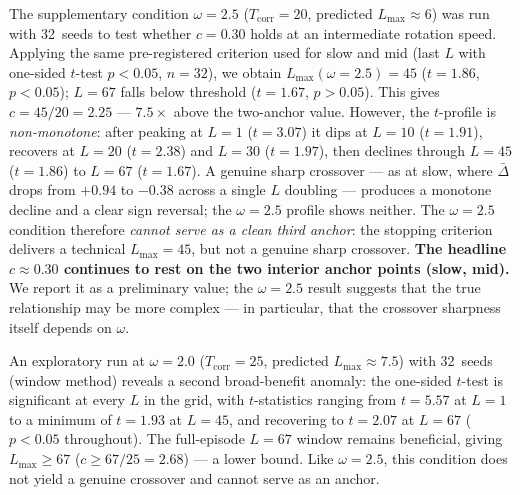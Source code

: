 \documentclass[sigconf,anonymous]{aamas}
\newcommand{\Dbar}{\bar{\Delta}}
\newcommand{\Lmax}{L_{\max}}
\newcommand{\Tcorr}{T_{\mathrm{corr}}}
\begin{document}
The supplementary condition $\omega{=}2.5$ ($\Tcorr{=}20$, predicted
$\Lmax\approx6$) was run with 32~seeds to test whether $c{=}0.30$
holds at an intermediate rotation speed.  Applying the same
pre-registered criterion used for slow and mid (last $L$ with one-sided
$t$-test $p{<}0.05$, $n{=}32$), we obtain $\Lmax(\omega{=}2.5){=}45$
($t{=}1.86$, $p{<}0.05$); $L{=}67$ falls below threshold
($t{=}1.67$, $p{>}0.05$).  This gives $c{=}45/20{=}2.25$ —
$7.5\times$ above the two-anchor value.  However, the $t$-profile is
\emph{non-monotone}: after peaking at $L{=}1$ ($t{=}3.07$) it dips
at $L{=}10$ ($t{=}1.91$), recovers at $L{=}20$ ($t{=}2.38$) and
$L{=}30$ ($t{=}1.97$), then declines through $L{=}45$ ($t{=}1.86$)
to $L{=}67$ ($t{=}1.67$).  A genuine sharp crossover — as at slow,
where $\Dbar$ drops from $+0.94$ to $-0.38$ across a single $L$
doubling — produces a monotone decline and a clear sign reversal; the
$\omega{=}2.5$ profile shows neither.  The $\omega{=}2.5$ condition
therefore \emph{cannot serve as a clean third anchor}: the stopping
criterion delivers a technical $\Lmax{=}45$, but not a genuine sharp
crossover.  \textbf{The headline $c \approx 0.30$
continues to rest on the two interior anchor points (slow, mid).}
We report it as a preliminary value; the $\omega{=}2.5$ result
suggests that the true relationship may be more complex — in
particular, that the crossover sharpness itself depends on $\omega$.

An exploratory run at $\omega{=}2.0$ ($\Tcorr{=}25$, predicted
$\Lmax\approx7.5$) with 32~seeds (window method) reveals a second
broad-benefit anomaly: the one-sided $t$-test is significant at
every $L$ in the grid, with $t$-statistics ranging from $t{=}5.57$
at $L{=}1$ to a minimum of $t{=}1.93$ at $L{=}45$, and recovering
to $t{=}2.07$ at $L{=}67$ ($p{<}0.05$ throughout).  The full-episode
$L{=}67$ window remains beneficial, giving $\Lmax\geq67$
($c\geq67/25{=}2.68$) — a lower bound.  Like $\omega{=}2.5$,
this condition does not yield a genuine crossover and cannot serve
as an anchor.
\end{document}
